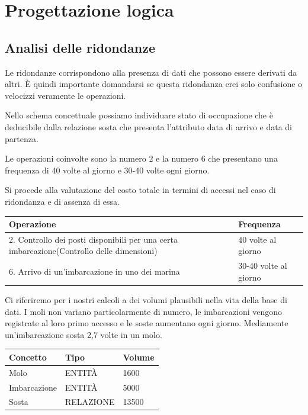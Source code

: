 \section{Progettazione logica}

\subsection{Analisi delle ridondanze}
Le ridondanze corrispondono alla presenza di dati che possono essere derivati da altri. È quindi importante domandarsi se questa ridondanza crei solo confusione o velocizzi veramente le operazioni.

Nello schema concettuale possiamo individuare stato di occupazione che è deducibile dalla relazione sosta che presenta l'attributo data di arrivo e data di partenza.

Le operazioni coinvolte sono la numero 2 e la numero 6 che presentano una frequenza di 40 volte al giorno e 30-40 volte ogni giorno.

Si procede alla valutazione del costo totale in termini di accessi nel caso di ridondanza e di assenza di essa.

\begin{center}
    \begin{tabularx}{\textwidth}{|p{90mm}|X|}
        \hline
        \rowcolor{gray!30}
        \textbf{Operazione} & \textbf{Frequenza}\\
        \hline
        2. Controllo dei posti disponibili per una certa imbarcazione(Controllo delle dimensioni)& 40 volte al giorno\\
        \hline
        6. Arrivo di un'imbarcazione in uno dei marina & 30-40 volte al giorno\\
        \hline
    \end{tabularx}
\end{center}

Ci riferiremo per i nostri calcoli a dei volumi plausibili nella vita della base di dati. I moli non variano particolarmente di numero, le imbarcazioni vengono registrate al loro primo accesso e le soste aumentano ogni giorno. Mediamente un'imbarcazione sosta 2,7 volte in un molo.

\begin{center}
    \begin{tabularx}{\textwidth}{|X|X|X|}
        \hline
        \rowcolor{gray!30}
        \textbf{Concetto} & \textbf{Tipo} & \textbf{Volume}\\
        \hline
        Molo & ENTITÀ & 1600\\
        \hline
        Imbarcazione & ENTITÀ & 5000\\
        \hline
        Sosta & RELAZIONE & 13500\\ %
        \hline
    \end{tabularx}
\end{center}


